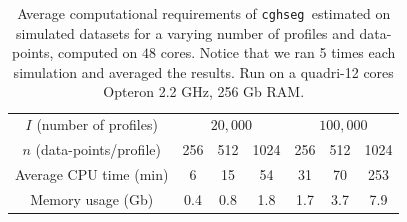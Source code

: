 \documentclass{llncs}
\newcommand{\esoft}{\texttt{cghseg }}
\begin{document}
\begin{table}[h!]
  \begin{center}
    \begin{tabular}{|c|ccc|ccc|}
      \hline
      $I$ (number of profiles) &  \multicolumn{3}{c}{$20,000$} & \multicolumn{3}{c|}{$100,000$} \\
      $n$ (data-points/profile) & 256 & 512 & 1024 & 256 & 512 & 1024\\
      \hline
      Average CPU time (min) & 6 & 15 & 54     & 31 & 70 & 253 \\
      Memory usage (Gb)      & 0.4 & 0.8 & 1.8    &  1.7 & 3.7 & 7.9 \\
      \hline
    \end{tabular}
    \caption{Average computational requirements of \esoft estimated on simulated datasets for a varying number of profiles and data-points, computed on $48$ cores. Notice that we ran 5 times each simulation and averaged the results. Run on a quadri-12 cores Opteron 2.2 GHz, 256 Gb RAM.}
    \label{tabtime}
  \end{center}
\end{table}



\end{document}
